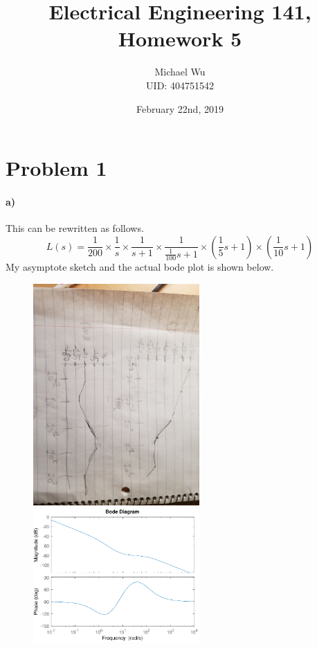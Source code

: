 \documentclass[12pt]{article}
\begin{document}
\title{Electrical Engineering 141, Homework 5}
\date{February 22nd, 2019}
\author{Michael Wu\\UID: 404751542}
\maketitle

\section*{Problem 1}

\paragraph{a)}

This can be rewritten as follows.
\[L(s)=\frac{1}{200}\times\frac{1}{s}\times\frac{1}{s+1}\times\frac{1}{\frac{1}{100}s+1}\times\left(\frac{1}{5}s+1\right)\times\left(\frac{1}{10}s+1\right)\]
My asymptote sketch and the actual bode plot is shown below.
\begin{figure}[H]
    \begin{center}
        \includegraphics[width=2.5in]{problem1a.jpg}
        \includegraphics[width=2.5in]{problem1a.pdf}
    \end{center}
\end{figure}
\end{document}
